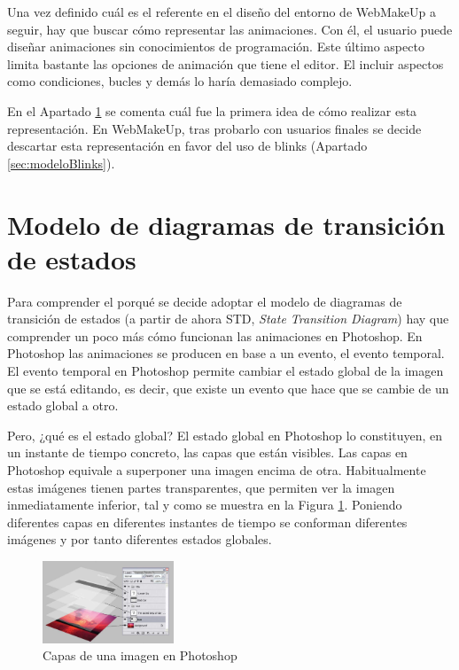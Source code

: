 Una vez definido cuál es el referente en el diseño del entorno de WebMakeUp a seguir, hay que buscar cómo representar las animaciones. Con él, el usuario puede diseñar animaciones sin conocimientos de programación. Este último aspecto limita bastante las opciones de animación que tiene el editor. El incluir aspectos como condiciones, bucles y demás lo haría demasiado complejo.

En el Apartado \ref{sec:modeloSTD} se comenta cuál fue la primera idea de cómo realizar esta representación. En WebMakeUp, tras probarlo con usuarios finales se decide descartar esta representación en favor del uso de blinks (Apartado \ref{sec:modeloBlinks}).

\section{Modelo de diagramas de transición de estados}
\label{sec:modeloSTD}

Para comprender el porqué se decide adoptar el modelo de diagramas de transición de estados (a partir de ahora STD, \emph{State Transition Diagram}) hay que comprender un poco más cómo funcionan las animaciones en Photoshop. En Photoshop las animaciones se producen en base a un evento, el evento temporal. El evento temporal en Photoshop permite cambiar el estado global de la imagen que se está editando, es decir, que existe un evento que hace que se cambie de un estado global a otro.

Pero, ¿qué es el estado global? El estado global en Photoshop lo constituyen, en un instante de tiempo concreto, las capas que están visibles. Las capas en Photoshop equivale a superponer una imagen encima de otra. Habitualmente estas imágenes tienen partes transparentes, que permiten ver la imagen inmediatamente inferior, tal y como se muestra en la Figura \ref{fig:PhotoshopCapas}. Poniendo diferentes capas en diferentes instantes de tiempo se conforman diferentes imágenes y por tanto diferentes estados globales.

\begin{figure}
\begin{center}
\includegraphics[width=0.35\textwidth]{figs/4-PhotoshopCapas.png}
\caption{Capas de una imagen en Photoshop}
\label{fig:PhotoshopCapas}
\end{center}
\end{figure}


